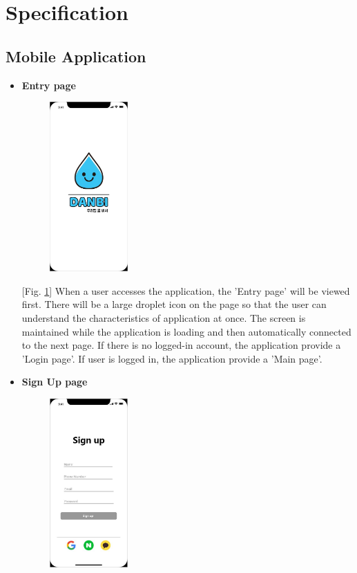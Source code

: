 \documentclass[conference]{IEEEtran}
\begin{document}
\section{Specification}

\subsection{Mobile Application}\label{AA}
\begin{itemize}
\setlength{\parindent}{2ex}
\setlength{\parskip}{0.5em}
\item \textbf{Entry page}

\par \begin{figure}[h!]
\includegraphics[width=3cm]{xd/entry page.JPG}
\centering
\caption{}
\label{fig:entry}
\end{figure}

[Fig. \ref{fig:entry}] When a user accesses the application, the 'Entry page' will be viewed first. There will be a large droplet icon on the page so that the user can understand the characteristics of application at once. The screen is maintained while the application is loading and then automatically connected to the next page. If there is no logged-in account, the application provide a 'Login page'. If user is logged in, the application provide a 'Main page'.

\item \textbf{Sign Up page}

\par \begin{figure}[h!]
\includegraphics[width=3cm]{xd/sign up page.JPG}
\centering
\caption{}
\label{fig:signup}
\end{figure}


\end{itemize}
\end{document}
